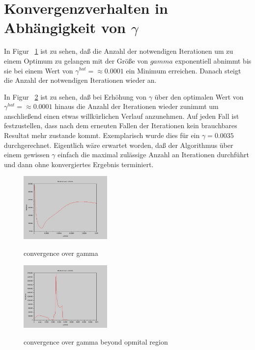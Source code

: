 \documentclass[]{report}
\begin{document}
\section{Konvergenzverhalten in Abh\"angigkeit von $\gamma$}

In Figur ~\ref{fig:ConvergenceOverGamma} ist zu sehen, da{\ss} die Anzahl der notwendigen Iterationen um zu einem Optimum zu gelangen mit der Gr\"o{\ss}e von $gamma$ exponentiell abnimmt bis sie bei einem Wert von $\gamma^{hat}= \approx 0.0001$ ein Minimum erreichen. Danach steigt die Anzahl der notwendigen Iterationen wieder an.

In Figur ~\ref{fig:ConvergenceOverGammaWDiverge} ist zu sehen, da{\ss} bei Erh\"ohung von $\gamma$ \"uber den optimalen Wert von $\gamma^{hat}= \approx 0.0001$ hinaus die Anzahl der Iterationen wieder zunimmt um anschlie{\ss}end einen etwas willk\"urlichen Verlauf anzunehmen. Auf jeden Fall ist festzustellen, dass nach dem erneuten Fallen der Iterationen kein brauchbares Resultat mehr zustande kommt. Exemplarisch wurde dies f\"ur ein $\gamma=0.0035$ durchgerechnet. Eigentlich w\"are erwartet worden, da{\ss} der Algorithmus \"uber einem gewissen $\gamma$ einfach die maximal zul\"assige Anzahl an Iterationen durchf\"uhrt und dann ohne konvergiertes Ergebnis terminiert.

\begin{figure}[h]
\centering
\includegraphics[width=0.4\textwidth]{./images/ConvergenceOverGamma.jpg} \\
\caption{convergence over gamma}
\label{fig:ConvergenceOverGamma}
\end{figure}

\begin{figure}[h]
\centering
\includegraphics[width=0.4\textwidth]{./images/ConvergenceOverGamma_w_diverge.jpg} \\
\caption{convergence over gamma beyond opmital region}
\label{fig:ConvergenceOverGammaWDiverge}
\end{figure}
\end{document}
